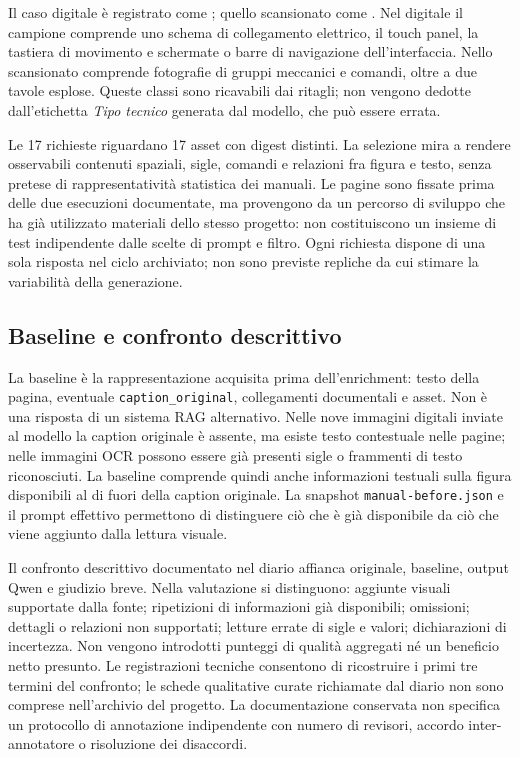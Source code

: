 Il caso digitale è registrato come ; quello scansionato come . Nel digitale il campione comprende uno schema di collegamento elettrico, il touch panel, la tastiera di movimento e schermate o barre di navigazione dell'interfaccia. Nello scansionato comprende fotografie di gruppi meccanici e comandi, oltre a due tavole esplose. Queste classi sono ricavabili dai ritagli; non vengono dedotte dall'etichetta \emph{Tipo tecnico} generata dal modello, che può essere errata.

Le 17 richieste riguardano 17 asset con digest distinti. La selezione mira a rendere osservabili contenuti spaziali, sigle, comandi e relazioni fra figura e testo, senza pretese di rappresentatività statistica dei manuali. Le pagine sono fissate prima delle due esecuzioni documentate, ma provengono da un percorso di sviluppo che ha già utilizzato materiali dello stesso progetto: non costituiscono un insieme di test indipendente dalle scelte di prompt e filtro. Ogni richiesta dispone di una sola risposta nel ciclo archiviato; non sono previste repliche da cui stimare la variabilità della generazione.

\subsection{Baseline e confronto descrittivo}

La baseline è la rappresentazione acquisita prima dell'enrichment: testo della pagina, eventuale \texttt{caption\_original}, collegamenti documentali e asset. Non è una risposta di un sistema RAG alternativo. Nelle nove immagini digitali inviate al modello la caption originale è assente, ma esiste testo contestuale nelle pagine; nelle immagini OCR possono essere già presenti sigle o frammenti di testo riconosciuti. La baseline comprende quindi anche informazioni testuali sulla figura disponibili al di fuori della caption originale. La snapshot \texttt{manual-before.json} e il prompt effettivo permettono di distinguere ciò che è già disponibile da ciò che viene aggiunto dalla lettura visuale.

Il confronto descrittivo documentato nel diario affianca originale, baseline, output Qwen e giudizio breve. Nella valutazione si distinguono: aggiunte visuali supportate dalla fonte; ripetizioni di informazioni già disponibili; omissioni; dettagli o relazioni non supportati; letture errate di sigle e valori; dichiarazioni di incertezza. Non vengono introdotti punteggi di qualità aggregati né un beneficio netto presunto. Le registrazioni tecniche consentono di ricostruire i primi tre termini del confronto; le schede qualitative curate richiamate dal diario non sono comprese nell'archivio del progetto. La documentazione conservata non specifica un protocollo di annotazione indipendente con numero di revisori, accordo inter-annotatore o risoluzione dei disaccordi.

